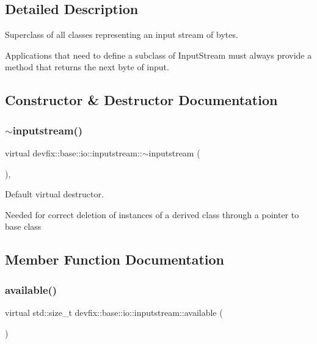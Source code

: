 \subsection{Detailed Description}
Superclass of all classes representing an input stream of bytes. 

Applications that need to define a subclass of Input\+Stream must always provide a method that returns the next byte of input. 

\subsection{Constructor \& Destructor Documentation}
\mbox{\label{structdevfix_1_1base_1_1io_1_1inputstream_a1da9f4c189be9ee315caabd2b4fdc125}} 
\subsubsection{\texorpdfstring{$\sim$inputstream()}{~inputstream()}}
{\footnotesize\ttfamily virtual devfix\+::base\+::io\+::inputstream\+::$\sim$inputstream (\begin{DoxyParamCaption}{ }\end{DoxyParamCaption})\hspace{0.3cm}{\ttfamily [virtual]}, {\ttfamily [default]}}



Default virtual destructor. 

Needed for correct deletion of instances of a derived class through a pointer to base class 

\subsection{Member Function Documentation}
\mbox{\label{structdevfix_1_1base_1_1io_1_1inputstream_ace04813af676b6c81fa452eb4d81a796}} 
\subsubsection{\texorpdfstring{available()}{available()}}
{\footnotesize\ttfamily virtual std\+::size\+\_\+t devfix\+::base\+::io\+::inputstream\+::available (\begin{DoxyParamCaption}{ }\end{DoxyParamCaption})\hspace{0.3cm}{\ttfamily [pure virtual]}}

